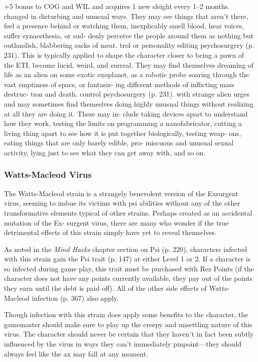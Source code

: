 +5 bonus to COG and WIL and acquires 1 new 
sleight every 1–2 months.
changed in disturbing and unusual ways. They 
may see things that aren't there, feel a presence 
behind or watching them, inexplicably smell 
blood, hear voices, suffer synaesthesia, or sud-
denly perceive the people around them as nothing 
but outlandish, blabbering sacks of meat.
trol or personality editing psychosurgery (p. 231). 
This is typically applied to shape the character 
closer to being a pawn of the ETI.
become lucid, weird, and surreal. They may find 
themselves dreaming of life as an alien on some 
exotic exoplanet, as a robotic probe soaring 
through the vast emptiness of space, or fantasiz-
ing different methods of inflicting mass destruc-
tion and death.
control psychosurgery (p. 231). 
with strange alien urges and may sometimes find 
themselves doing highly unusual things without 
realizing at all they are doing it. These may in-
clude taking devices apart to understand how 
they work, testing the limits on programming a 
nanofabricator, cutting a living thing apart to see 
how it is put together biologically, testing weap-
ons, eating things that are only barely edible, pro-
miscuous and unusual sexual activity, lying just 
to see what they can get away with, and so on.

\subsubsection{Watts-Macleod Virus}

The Watts-Macleod strain is a strangely benevolent 
version of the Exsurgent virus, seeming to imbue its 
victims with psi abilities without any of the other 
transformative elements typical of other strains. 
Perhaps created as an accidental mutation of the Ex-
surgent virus, there are many who wonder if the true 
detrimental effects of this strain simply have yet to 
reveal themselves.

As noted in the \textit{Mind Hacks} chapter section on Psi 
(p. 220), characters infected with this strain gain the 
Psi trait (p. 147) at either Level 1 or 2. If a character 
is so infected during game play, this trait must be 
purchased with Rez Points (if the character does not 
have any points currently available, they pay out of 
the points they earn until the debt is paid off). All of 
the other side effects of Watts-Macleod infection (p. 
367) also apply.

Though infection with this strain does apply some 
benefits to the character, the gamemaster should make 
sure to play up the creepy and unsettling nature of 
this virus. The character should never be certain that 
they haven't in fact been subtly influenced by the virus 
in ways they can't immediately pinpoint—they should 
always feel like the ax may fall at any moment.

